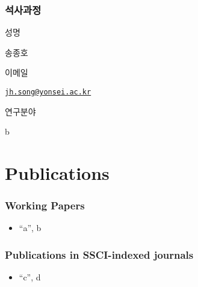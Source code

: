 \documentclass[
]{book}
\providecommand{\tightlist}{%
  \setlength{\itemsep}{0pt}\setlength{\parskip}{0pt}}
\begin{document}
\hypertarget{uxc11duxc0acuxacfcuxc815}{%
\subsection*{석사과정}\label{uxc11duxc0acuxacfcuxc815}}

성명

송종호

이메일

\href{mailto:jh.song@yonsei.ac.kr}{\nolinkurl{jh.song@yonsei.ac.kr}}

연구분야

b

\hypertarget{publications}{%
\chapter*{Publications}\label{publications}}

\hypertarget{working-papers}{%
\subsection*{Working Papers}\label{working-papers}}

\begin{itemize}
\tightlist
\item
  ``a'', b
\end{itemize}

\hypertarget{publications-in-ssci-indexed-journals}{%
\subsection*{Publications in SSCI-indexed journals}\label{publications-in-ssci-indexed-journals}}

\begin{itemize}
\tightlist
\item
  ``c'', d
\end{itemize}

  
\end{document}
